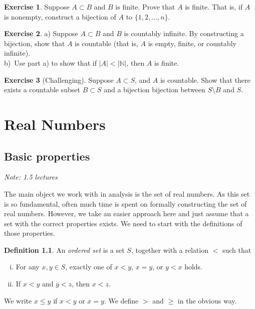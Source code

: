 \documentclass[12pt]{book}
\newcommand{\abs}[1]{\left\lvert {#1} \right\rvert}
\newcommand{\N}{{\mathbb{N}}}
\newcommand{\myindex}[1]{#1\index{#1}}
\newcommand{\sectionnotes}[1]{\noindent \emph{Note: #1} \medskip \par}
\theoremstyle{plain}
\theoremstyle{remark}
\theoremstyle{definition}
\newtheorem{defn}[thm]{Definition}
\theoremstyle{exercise}
\newtheorem{exercise}{Exercise}[section]
\theoremstyle{example}
\begin{document}
\begin{exercise}
Suppose $A \subset B$ and $B$ is finite. Prove that $A$ is finite.
That is, if $A$ is nonempty, construct a bijection of $A$ to $\{ 1,2,\ldots,n \}$.
\end{exercise}

\begin{exercise}
a) Suppose $A \subset B$ and $B$ is countably infinite.  By constructing a
bijection, show that $A$ is
countable (that is, $A$ is empty, finite, or countably infinite).
\\
b)~Use part a) to show that if $\abs{A} < \abs{\N}$, then $A$ is finite.
\end{exercise}

\begin{exercise}[Challenging] \label{exercise:countsubsetbij}
Suppose $A \subset S$, and $A$ is countable.
Show that there exists a countable subset $B \subset S$ and
a bijection bijection between $S \setminus B$ and $S$.
\end{exercise}



\chapter{Real Numbers} \label{rn:chapter}


\section{Basic properties} \label{sec:basicpropsrn}

\sectionnotes{1.5 lectures}

The main object we work with in analysis is the set of
\myindex{real numbers}.  As this set is so fundamental, often much time is
spent on formally constructing the set of real numbers.  However, we 
take an easier approach here and just assume that a set with the correct
properties exists.  We need to start with the definitions of those
properties.

\begin{defn}
An \emph{\myindex{ordered set}} is a set $S$, together with
a relation $<$ such that
\begin{enumerate}[(i)]
\item For any $x, y \in S$, exactly one of
$x < y$, $x=y$, or $y < x$ holds.
\item If $x < y$ and $y < z$, then $x < z$.
\end{enumerate}
We write $x \leq y$ if $x < y$ or $x=y$.  We define
$>$ and $\geq$ in the obvious way.
\end{defn}
\end{document}
